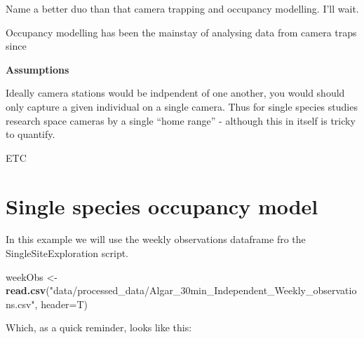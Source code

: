 \documentclass[]{book}
\newenvironment{Shaded}{\begin{snugshade}}{\end{snugshade}}
\newcommand{\KeywordTok}[1]{\textcolor[rgb]{0.13,0.29,0.53}{\textbf{#1}}}
\newcommand{\DataTypeTok}[1]{\textcolor[rgb]{0.13,0.29,0.53}{#1}}
\newcommand{\StringTok}[1]{\textcolor[rgb]{0.31,0.60,0.02}{#1}}
\newcommand{\OperatorTok}[1]{\textcolor[rgb]{0.81,0.36,0.00}{\textbf{#1}}}
\newcommand{\NormalTok}[1]{#1}
\begin{document}
Name a better duo than that camera trapping and occupancy modelling.
I'll wait.

Occupancy modelling has been the mainstay of analysing data from camera
traps since

\textbf{Assumptions}

Ideally camera stations would be indpendent of one another, you would
should only capture a given individual on a single camera. Thus for
single species studies research space cameras by a single ``home range''
- although this in itself is tricky to quantify.

ETC

\section{Single species occupancy
model}\label{single-species-occupancy-model}

In this example we will use the weekly observations dataframe fro the
SingleSiteExploration script.

\begin{Shaded}
\begin{Highlighting}[]
\NormalTok{weekObs <-}\StringTok{ }\KeywordTok{read.csv}\NormalTok{(}\StringTok{"data/processed_data/Algar_30min_Independent_Weekly_observations.csv"}\NormalTok{, }\DataTypeTok{header=}\NormalTok{T)}
\end{Highlighting}
\end{Shaded}

Which, as a quick reminder, looks like this:

\begin{Shaded}
\end{Shaded}
\end{document}
